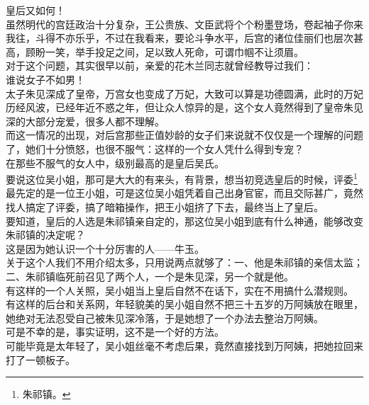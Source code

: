 \begin{multicols}{\theparacolNo}
皇后又如何！\\

虽然明代的宫廷政治十分复杂，王公贵族、文臣武将个个粉墨登场，卷起袖子你来我往，斗得不亦乐乎，不过在我看来，要论斗争水平，后宫的诸位佳丽们也层次甚高，顾盼一笑，举手投足之间，足以致人死命，可谓巾帼不让须眉。\\

对于这个问题，其实很早以前，亲爱的花木兰同志就曾经教导过我们：\\

谁说女子不如男！\\

太子朱见深成了皇帝，万宫女也变成了万妃，大致可以算是功德圆满，此时的万妃历经风波，已经年近不惑之年，但让众人惊异的是，这个女人竟然得到了皇帝朱见深的大部分宠爱，很多人都不理解。\\

而这一情况的出现，对后宫那些正值妙龄的女子们来说就不仅仅是一个理解的问题了，她们十分愤怒，也很不服气：这样的一个女人凭什么得到专宠？\\

在那些不服气的女人中，级别最高的是皇后吴氏。\\

要说这位吴小姐，那可是大大的有来头，有背景，想当初竞选皇后的时候，评委\footnote{朱祁镇。}最先定的是一位王小姐，可是这位吴小姐凭着自己出身官宦，而且交际甚广，竟然找人搞定了评委，搞了暗箱操作，把王小姐挤了下去，最终当上了皇后。\\

要知道，皇后的人选是朱祁镇亲自定的，那这位吴小姐到底有什么神通，能够改变朱祁镇的决定呢？\\

这是因为她认识一个十分厉害的人——牛玉。\\

关于这个人我们不用介绍太多，只用说两点就够了：一、他是朱祁镇的亲信太监；二、朱祁镇临死前召见了两个人，一个是朱见深，另一个就是他。\\

有这样的一个人关照，吴小姐当上皇后自然不在话下，实在不用搞什么潜规则。\\

有这样的后台和关系网，年轻貌美的吴小姐自然不把三十五岁的万阿姨放在眼里，她绝对无法忍受自己被朱见深冷落，于是她想了一个办法去整治万阿姨。\\

可是不幸的是，事实证明，这不是一个好的方法。\\

可能毕竟是太年轻了，吴小姐丝毫不考虑后果，竟然直接找到万阿姨，把她拉回来打了一顿板子。\\


\end{multicols}
